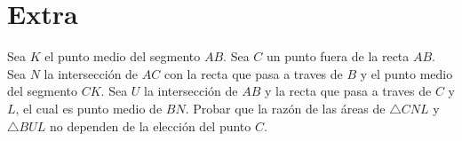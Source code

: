 \section{Extra}

\begin{section-problem}
    Sea $K$ el punto medio del segmento $AB$.
    Sea $C$ un punto fuera de la recta $AB$.
    Sea $N$ la intersección de $AC$ con la recta que pasa a traves de $B$ y el punto medio del segmento $CK$.
    Sea $U$ la intersección de $AB$ y la recta que pasa a traves de $C$ y $L$, el cual es punto medio de $BN$.
    Probar que la razón de las áreas de $\triangle CNL$ y $\triangle BUL$ no dependen de la elección del punto $C$.
\end{section-problem}